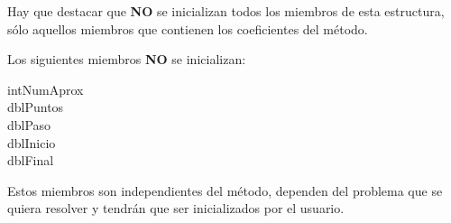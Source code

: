 Hay que destacar que \textbf{NO} se inicializan todos los miembros de esta
estructura, s\'olo aquellos miembros que contienen los coeficientes del 
m\'etodo.\newline

Los siguientes miembros \textbf{NO} se inicializan:
%
\begin{description}
\item[intNumAprox]
\item[dblPuntos]
\item[dblPaso]
\item[dblInicio]
\item[dblFinal]
\end{description}

Estos miembros son independientes del m\'etodo, dependen del problema que
se quiera resolver y tendr\'an que ser inicializados por el usuario.
